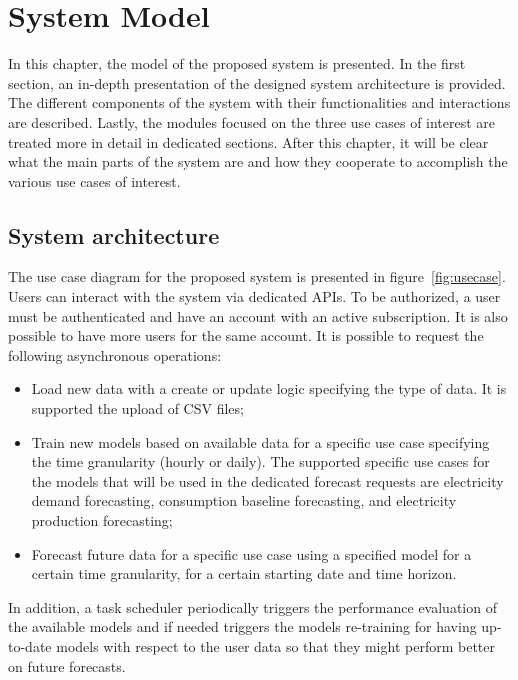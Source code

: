 \chapter{System Model}
\label{cha:system}
\vspace{0.4 cm}

In this chapter, the model of the proposed system is presented.
In the first section, an in-depth presentation of the designed system architecture is provided.
The different components of the system with their functionalities and interactions are described.
Lastly, the modules focused on the three use cases of interest are treated more in detail in dedicated sections.
After this chapter, it will be clear what the main parts of the system are and how they cooperate to accomplish the various use cases of interest.


\section{System architecture}
\label{sec:architecture}
\vspace{0.2 cm}

The use case diagram for the proposed system is presented in figure~\ref{fig:usecase}.
Users can interact with the system via dedicated APIs.
To be authorized, a user must be authenticated and have an account with an active subscription.
It is also possible to have more users for the same account.
It is possible to request the following asynchronous operations:
\begin{itemize}
  \item Load new data with a create or update logic specifying the type of data. It is supported the upload of CSV files;
  \item Train new models based on available data for a specific use case specifying the time granularity (hourly or daily). The supported specific use cases for the models that will be used in the dedicated forecast requests are electricity demand forecasting, consumption baseline forecasting, and electricity production forecasting;
  \item Forecast future data for a specific use case using a specified model for a certain time granularity, for a certain starting date and time horizon.
\end{itemize}

In addition, a task scheduler periodically triggers the performance evaluation of the available models and if needed triggers the models re-training for having up-to-date models with respect to the user data so that they might perform better on future forecasts.

